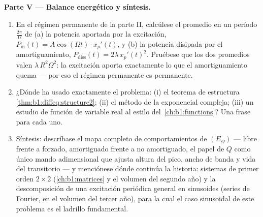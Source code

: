 \begin{problem}
\medskip
\noindent\textbf{Parte V --- Balance energético y síntesis.}
\begin{enumerate}[resume]
  \item En el régimen permanente de la parte II, calcúlese el
        promedio en un período $\frac{2\pi}\Omega$ de (a) la potencia
        aportada por la excitación, $P_{\mathrm{in}}(t) =
        A\cos(\Omega t) \cdot x_p'(t)$, y (b) la potencia disipada por
        el amortiguamiento, $P_{\mathrm{diss}}(t) =
        2\lambda\,x_p'(t)^2$. Pruébese que los dos promedios valen
        $\lambda\,R^2\Omega^2$: la excitación aporta exactamente lo que
        el amortiguamiento quema --- por eso el régimen permanente es
        permanente.
  \item ¿Dónde ha usado exactamente el problema: (i) el teorema de
        estructura \cref{thm:b1:diffeq:structure2}; (ii) el método de
        la exponencial compleja; (iii) un estudio de función de
        variable real al estilo del~\cref{ch:b1:functions}? Una frase
        para cada uno.
  \item Síntesis: descríbase el mapa completo de comportamientos de
        $(E_\Omega)$ --- libre frente a forzado, amortiguado frente a
        no amortiguado, el papel de $Q$ como único mando adimensional
        que ajusta altura del pico, ancho de banda y vida del
        transitorio --- y menciónese dónde continúa la historia:
        sistemas de primer orden $2 \times 2$ (\cref{ch:b1:matrices} y
        el volumen del segundo año) y la descomposición de una
        excitación periódica general en sinusoides (series de Fourier,
        en el volumen del tercer año), para la cual el caso sinusoidal
        de este problema es el ladrillo fundamental.
\end{enumerate}
\end{problem}
